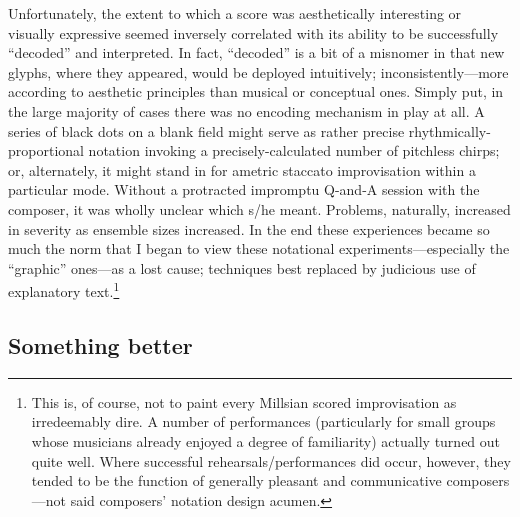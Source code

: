     Unfortunately, the extent to which a score was aesthetically interesting or visually expressive seemed inversely correlated with its ability to be successfully ``decoded'' and interpreted. In fact, ``decoded'' is a bit of a misnomer in that new glyphs, where they appeared, would be deployed intuitively; inconsistently---more according to aesthetic principles than musical or conceptual ones. Simply put, in the large majority of cases there was no encoding mechanism in play at all. A series of black dots on a blank field might serve as rather precise rhythmically-proportional notation invoking a precisely-calculated number of pitchless chirps; or, alternately, it might stand in for ametric staccato improvisation within a particular mode. Without a protracted impromptu Q-and-A session with the composer, it was wholly unclear which s/he meant. Problems, naturally, increased in severity as ensemble sizes increased. In the end these experiences became so much the norm that I began to view these notational experiments---especially the ``graphic'' ones---as a lost cause; techniques best replaced by judicious use of explanatory text.\footnote{This is, of course, not to paint every Millsian scored improvisation as irredeemably dire. A number of performances (particularly for small groups whose musicians already enjoyed a degree of familiarity) actually turned out quite well. Where successful rehearsals/performances did occur, however, they tended to be the function of generally pleasant and communicative composers---not said composers' notation design acumen.}

    
\subsection{Something better}


